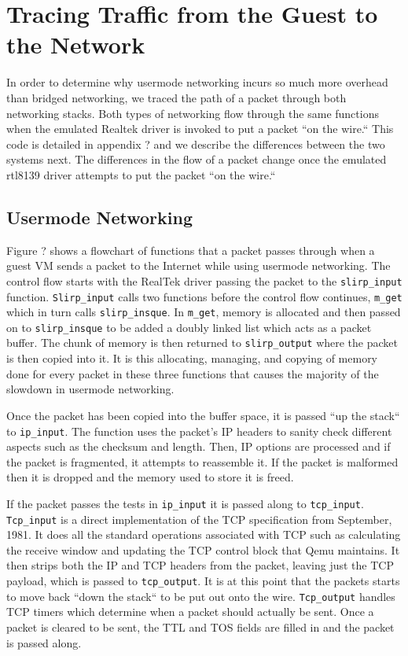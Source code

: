 \section{Tracing Traffic from the Guest to the Network}
\label{sec:trace}

In order to determine why usermode networking incurs so much more overhead than bridged networking, we traced the path of a packet through both networking stacks.
Both types of networking flow through the same functions when the emulated Realtek driver is invoked to put a packet ``on the wire.``
This code is detailed in appendix ? and we describe the differences between the two systems next.
The differences in the flow of a packet change once the emulated rtl8139 driver attempts to put the packet ``on the wire.``

\subsection{Usermode Networking}
\label{subsec:usermode}

Figure ? shows a flowchart of functions that a packet passes through when a guest VM sends a packet to the Internet while using usermode networking.
The control flow starts with the RealTek driver passing the packet to the \texttt{slirp_input} function.
\texttt{Slirp_input} calls two functions before the control flow continues, \texttt{m_get} which in turn calls \texttt{slirp_insque}.
In \texttt{m_get}, memory is allocated and then passed on to \texttt{slirp_insque} to be added a doubly linked list which acts as a packet buffer.
The chunk of memory is then returned to \texttt{slirp_output} where the packet is then copied into it. %
It is this allocating, managing, and copying of memory done for every packet in these three functions that causes the majority of the slowdown in usermode networking.

Once the packet has been copied into the buffer space, it is passed ``up the stack`` to \texttt{ip_input}. 
The function uses the packet's IP headers to sanity check different aspects such as the checksum and length.
Then, IP options are processed and if the packet is fragmented, it attempts to reassemble it.
If the packet is malformed then it is dropped and the memory used to store it is freed.

If the packet passes the tests in \texttt{ip_input} it is passed along to \texttt{tcp_input}.
\texttt{Tcp_input} is a direct implementation of the TCP specification from September, 1981.
It does all the standard operations associated with TCP such as calculating the receive window and updating the TCP control block that Qemu maintains.
It then strips both the IP and TCP headers from the packet, leaving just the TCP payload, which is passed to \texttt{tcp_output}.
It is at this point that the packets starts to move back ``down the stack`` to be put out onto the wire.
\texttt{Tcp_output} handles TCP timers which determine when a packet should actually be sent.
Once a packet is cleared to be sent, the TTL and TOS fields are filled in and the packet is passed along.


